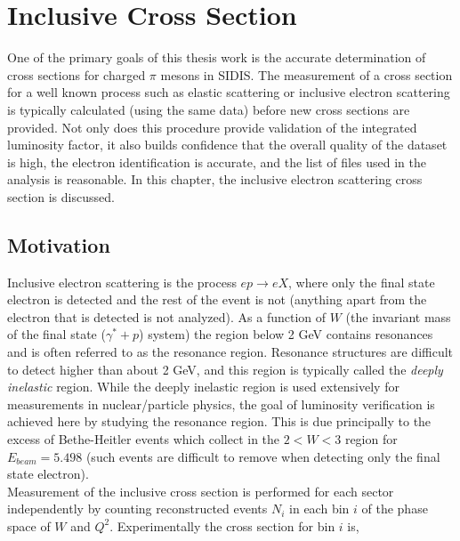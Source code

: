 %

\chapter{Inclusive Cross Section}

One of the primary goals of this thesis work is the accurate determination of cross sections for charged $\pi$ mesons in SIDIS.  The measurement of a cross section for a well known process such as elastic scattering or inclusive electron scattering is typically calculated (using the same data) before new cross sections are provided.  Not only does this procedure provide validation of the integrated luminosity factor, it also builds confidence that the overall quality of the dataset is high, the electron identification is accurate, and the list of files used in the analysis is reasonable.  In this chapter, the inclusive electron scattering cross section is discussed.  \\

\section{Motivation}
Inclusive electron scattering is the process $e p \rightarrow e X$, where only the final state electron is detected and the rest of the event is not (anything apart from the electron that is detected is not analyzed).  As a function of $W$ (the invariant mass of the final state ($\gamma^* + p$) system) the region below 2 GeV contains resonances and is often referred to as the resonance region.  Resonance structures are difficult to detect higher than about 2 GeV, and this region is typically called the \textit{deeply inelastic} region.  While the deeply inelastic region is used extensively for measurements in nuclear/particle physics, the goal of luminosity verification is achieved here by studying the resonance region.  This is due principally to the excess of Bethe-Heitler events which collect in the $2 < W < 3$ region for $E_{beam} = 5.498$ (such events are difficult to remove when detecting only the final state electron). \\

Measurement of the inclusive cross section is performed for each sector independently by counting reconstructed events $N_i$ in each bin $i$ of the phase space of $W$ and $Q^2$.  Experimentally the cross section for bin $i$ is, 

